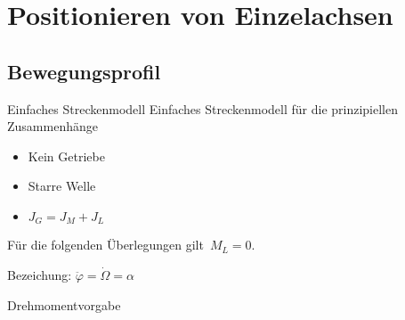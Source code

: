 \section[\thesection \  Positionieren von Einzelachsen]{Positionieren von
Einzelachsen}\label{sec:positioneinzelachsen}
%
%
\subsection[\thesection .\thesubsection \ 
Bewegungsprofil]{Bewegungsprofil}\label{sec:bewegungsprofil}
%
\begin{frame}{Einfaches Streckenmodell}
%
Einfaches Streckenmodell für die prinzipiellen Zusammenhänge
%
\begin{itemize}
  \item Kein Getriebe
  \item Starre Welle
  \item $J_G=J_M+J_L$
\end{itemize}
%
\begin{center}
%

%
\end{center}
%

\vspace{12pt}

Für die folgenden Überlegungen gilt~$M_L=0$.

\vspace{6pt}

Bezeichung: $\ddot \varphi =\dot \Omega = \alpha$

\vfill

%
\end{frame}
%
%
\begin{frame}{Drehmomentvorgabe}
%

%
\end{frame}
%
%
